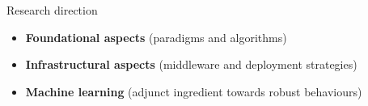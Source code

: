 \begin{frame}{Research direction}
  \begin{cardTiny}
    \centering  
    \textbf{}
  \end{cardTiny}
  \begin{card}
    \begin{itemize}
      \item \textbf{Foundational aspects} (paradigms and algorithms)
      \item \textbf{Infrastructural aspects} (middleware and deployment strategies)
      \item \textbf{Machine learning} (adjunct ingredient towards robust behaviours)
    \end{itemize}
  \end{card}
\end{frame}